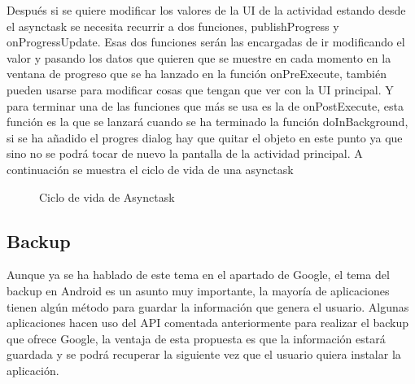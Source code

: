 Después si se quiere modificar los valores de la UI de la actividad estando desde el asynctask se necesita recurrir a dos funciones, publishProgress y onProgressUpdate.
Esas dos funciones serán las encargadas de ir modificando el valor y pasando los datos que quieren que se muestre en cada momento en la ventana de progreso que se ha lanzado en la función onPreExecute, también pueden usarse para modificar cosas que tengan que ver con la UI principal.
Y para terminar una de las funciones que más se usa es la de onPostExecute, esta función es la que se lanzará cuando se ha terminado  la función doInBackground, si se ha añadido el progres dialog hay que quitar el objeto en este punto ya que sino no se podrá tocar de nuevo la pantalla de la actividad principal.
A continuación se muestra el ciclo de vida de una asynctask

\begin{figure}[H] 
  \begin{center} 
    \caption{Ciclo de vida de Asynctask} 
    \label{fig:CicloVidaAsynctask} 
  \end{center} 
\end{figure}

\subsection{Backup}
\label{subsecc:Backup}

Aunque ya se ha hablado de este tema en el apartado de Google, el tema del backup en Android es un asunto muy importante, la mayoría de aplicaciones tienen algún método para guardar la información que genera el usuario.
Algunas aplicaciones hacen uso del API comentada anteriormente para realizar el backup que ofrece Google, la ventaja de esta propuesta es que la información estará guardada y se podrá recuperar la siguiente vez que el usuario quiera instalar la aplicación.

